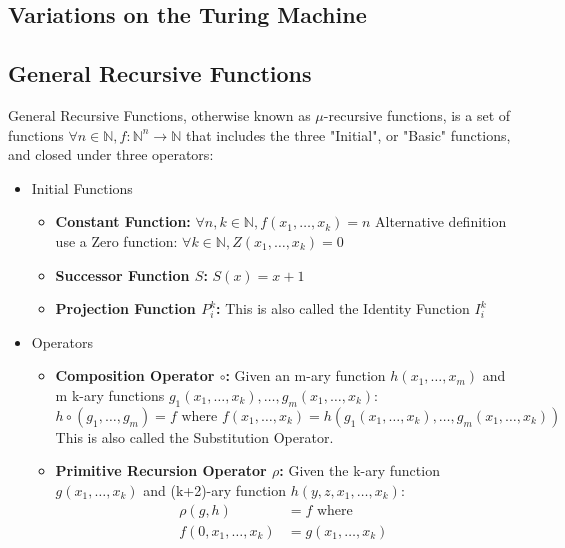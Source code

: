 \documentclass{report}
\begin{document}
			\subsection{Variations on the Turing Machine} \label{var_TM}
			
			\subsection{General Recursive Functions}
				\begin{defn} \label{def_general_recursive_function}
					General Recursive Functions, otherwise known as $\mu$-recursive functions, is a set of functions $\forall n \in \mathbb{N}, f:\mathbb{N}^n \rightarrow \mathbb{N}$ that includes the three "Initial", or "Basic" functions, and closed under three operators:
					\begin{itemize}
						\item Initial Functions
						\begin{itemize}
							\item \textbf{Constant Function:} $\forall n,k \in \mathbb{N}, f(x_1,\dots,x_k)=n$
								\subitem Alternative definition use a Zero function: $\forall k \in \mathbb{N}, Z(x_1,\dots,x_k)=0$
							\item \textbf{Successor Function $S$:} $S(x)=x+1$
							\item \textbf{Projection Function $P_i^k$:}
								\subitem This is also called the Identity Function $I_i^k$
						\end{itemize}
						\item Operators
						\begin{itemize}
							\item \textbf{Composition Operator $\circ$:} Given an m-ary function $h(x_1,\dots,x_m)$ and m k-ary functions $g_1(x_1,\dots,x_k),\dots,g_m(x_1,\dots,x_k)$:
							\begin{displaymath}
								h \circ (g_1,\dots,g_m)=f \text{   where   } f(x_1,\dots,x_k)=h(g_1(x_1,\dots,x_k),\dots,g_m(x_1,\dots,x_k))
							\end{displaymath}
								\subitem This is also called the Substitution Operator.
							\item \textbf{Primitive Recursion Operator $\rho$:} Given the k-ary function $g(x_1,\dots,x_k)$ and (k+2)-ary function $h(y,z,x_1,\dots,x_k)$:
							\begin{align*}
								\rho(g,h)&=f \text{   where}\\
								f(0,x_1,\dots,x_k)&=g(x_1,\dots,x_k)\\

\end{align*}
\end{itemize}
\end{itemize}
\end{defn}
\end{document}
